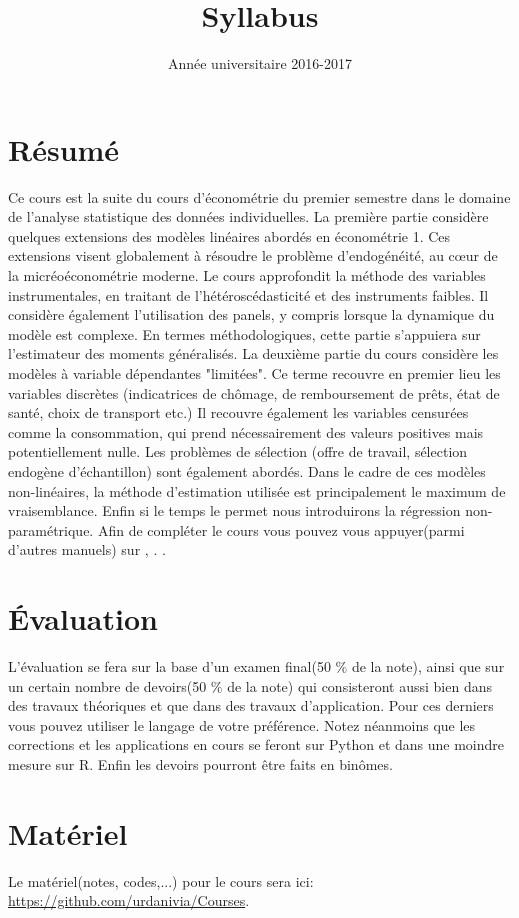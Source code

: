 \documentclass[12pt, reqno]{amsart}
\title{Syllabus}
\date{Année universitaire 2016-2017}
\begin{document}
\maketitle
\section{Résumé}
Ce cours est la suite du cours d'économétrie du premier semestre dans le domaine de l'analyse statistique des données individuelles. La première partie considère quelques extensions des modèles linéaires abordés en économétrie 1. Ces extensions visent globalement à résoudre le problème d'endogénéité, au cœur de la micréoéconométrie moderne. Le cours approfondit la méthode des variables instrumentales, en traitant de l'hétéroscédasticité et des instruments faibles. Il considère également  l'utilisation des panels, y compris lorsque la dynamique du modèle est complexe. En termes méthodologiques, cette partie s'appuiera sur l'estimateur des moments généralisés. La deuxième partie du cours considère les modèles à variable dépendantes "limitées". Ce terme recouvre en premier lieu les variables discrètes (indicatrices de chômage, de remboursement de prêts, état de santé, choix de transport etc.) Il recouvre également les variables censurées comme la consommation, qui prend nécessairement des valeurs positives mais potentiellement nulle. Les problèmes de sélection (offre de travail, sélection endogène d'échantillon) sont également abordés. Dans le cadre de ces modèles non-linéaires, la méthode d'estimation utilisée est principalement le maximum de vraisemblance. Enfin si le temps le permet nous introduirons la régression non-paramétrique. Afin de compléter le cours vous pouvez vous appuyer(parmi d'autres manuels)  sur \cite{Wooldridge2010},  \cite{Amemiya1985}. \cite{White1980}.

\section{\'Evaluation}
L'évaluation se fera sur la base d'un examen final(50 $\%$ de la note), ainsi que sur un certain nombre de devoirs(50 $\%$ de la note) qui consisteront aussi bien dans des travaux théoriques et que dans des travaux d'application. Pour ces derniers vous pouvez utiliser le langage de votre préférence. Notez néanmoins que les corrections et les applications en cours se feront sur Python et dans une moindre mesure sur R. Enfin les devoirs pourront être faits en binômes.

\section*{Matériel}
Le matériel(notes, codes,...) pour le cours sera ici:  \url{https://github.com/urdanivia/Courses}.
\end{document}
